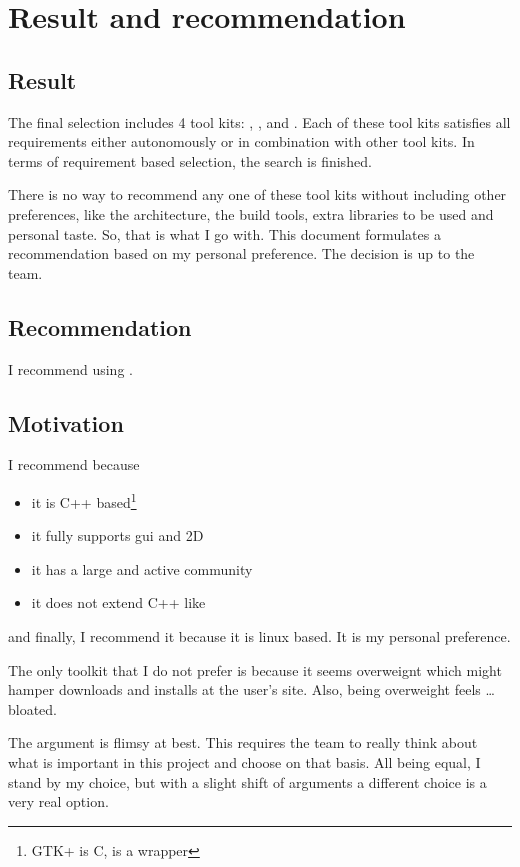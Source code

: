 \section{Result and recommendation}

\subsection{Result}

The final selection includes 4 tool kits: , ,  
and . Each of these tool kits satisfies all requirements either 
autonomously or in combination with other tool kits. In terms of requirement 
based selection, the search is finished. 

There is no way to recommend any one of these tool kits without including other 
preferences, like the architecture, the build tools, extra libraries to be used
and personal taste. So, that is what I go with. This document formulates a 
recommendation based on my personal preference. The decision is up to the 
team.

\subsection{Recommendation} 

I recommend using .

\subsection{Motivation}

I recommend  because
\begin{itemize}
	\item it is C++ based\footnote{GTK+ is C,  is a wrapper}
	\item it fully supports gui and 2D
	\item it has a large and active community
	\item it does not extend C++ like 
\end{itemize}

and finally, I recommend it because it is linux based. It is my personal preference.

The only toolkit that I do not prefer is  because
it seems overweignt which might hamper downloads and installs at the user's site.
Also, being overweight feels \ldots bloated.

The argument is flimsy at best. This requires the team to really think about what is 
important in this project and choose on that basis. All being equal, I stand by
my choice, but with a slight shift of arguments a different choice is a very real option.


